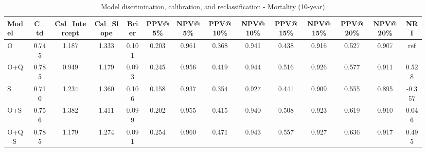 \begin{table}[htbp]
\centering
\small
\caption{Model discrimination, calibration, and reclassification - Mortality (10-year)}
\label{tab:perf_mortality_10y}
\begin{tabular}{lccccccccccccc}
\toprule
Model & C\_td & Cal\_Intercept & Cal\_Slope & Brier & PPV@5\% & NPV@5\% & PPV@10\% & NPV@10\% & PPV@15\% & NPV@15\% & PPV@20\% & NPV@20\% & NRI \\
\midrule
O & 0.745 & 1.187 & 1.333 & 0.101 & 0.203 & 0.961 & 0.368 & 0.941 & 0.438 & 0.916 & 0.527 & 0.907 & ref \\
O+Q & 0.785 & 0.949 & 1.179 & 0.093 & 0.245 & 0.956 & 0.419 & 0.944 & 0.516 & 0.926 & 0.577 & 0.911 & 0.528 \\
S & 0.710 & 1.234 & 1.360 & 0.106 & 0.158 & 0.937 & 0.354 & 0.927 & 0.441 & 0.909 & 0.555 & 0.895 & -0.357 \\
O+S & 0.756 & 1.382 & 1.411 & 0.099 & 0.202 & 0.955 & 0.415 & 0.940 & 0.508 & 0.923 & 0.619 & 0.910 & 0.046 \\
O+Q+S & 0.785 & 1.179 & 1.274 & 0.091 & 0.254 & 0.960 & 0.471 & 0.943 & 0.557 & 0.927 & 0.636 & 0.917 & 0.495 \\
\bottomrule
\end{tabular}
\end{table}